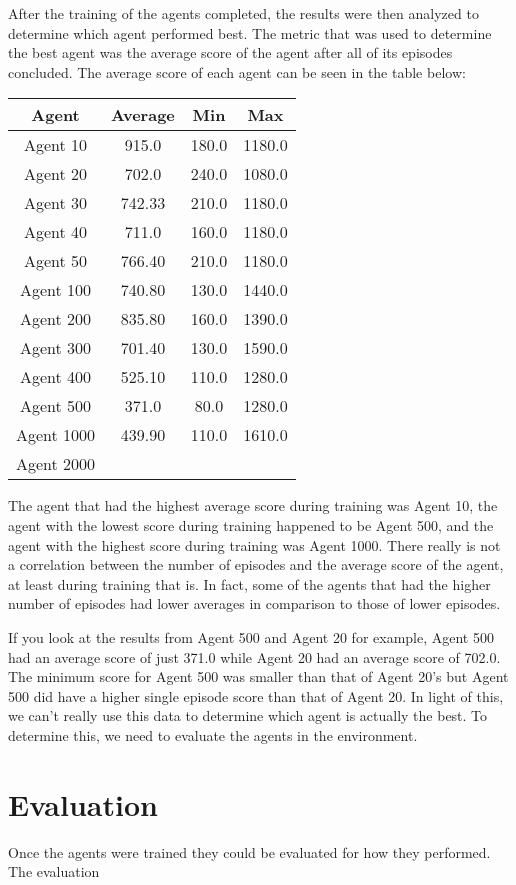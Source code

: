 \documentclass[
	a4paper, %
	10pt, %
	unnumberedsections, %
	twoside, %
]{LTJournalArticle}
\begin{document}
After the training of the agents completed, the results were then analyzed to determine which agent performed best. The metric that was used to determine the best agent was the average score of the agent
after all of its episodes concluded. The average score of each agent can be seen in the table below:

\begin{center}
	\begin{tabular}[ht]{|c|c|c|c|}
		\hline \textbf{Agent} & \textbf{Average} & \textbf{Min} & \textbf{Max} \\ \hline
		Agent 10 & 915.0 & 180.0 & 1180.0 \\ \hline
		Agent 20 & 702.0 & 240.0 & 1080.0 \\ \hline
		Agent 30 & 742.33 & 210.0 & 1180.0 \\ \hline
		Agent 40 & 711.0 & 160.0 & 1180.0 \\ \hline
		Agent 50 & 766.40 & 210.0 & 1180.0 \\ \hline
		Agent 100 & 740.80 & 130.0 & 1440.0 \\ \hline
		Agent 200 & 835.80 & 160.0 & 1390.0 \\ \hline
		Agent 300 & 701.40 & 130.0 & 1590.0 \\ \hline
		Agent 400 & 525.10 & 110.0 & 1280.0 \\ \hline
		Agent 500 & 371.0 & 80.0 & 1280.0 \\ \hline
		Agent 1000 & 439.90 & 110.0 & 1610.0 \\ \hline
		Agent 2000 & & & \\ \hline
	\end{tabular}
\end{center}

The agent that had the highest average score during training was Agent 10, the agent with the lowest score during training happened to be Agent 500, and the agent with the highest score during training was
Agent 1000. There really is not a correlation between the number of episodes and the average score of the agent, at least during training that is. In fact, some of the agents that had the higher number of
episodes had lower averages in comparison to those of lower episodes.

If you look at the results from Agent 500 and Agent 20 for example, Agent 500 had an average score of just 371.0 while Agent 20 had an average score of 702.0. The minimum score for Agent 500 was
smaller than that of Agent 20's but Agent 500 did have a higher single episode score than that of Agent 20. In light of this, we can't really use this data to determine which agent is actually the best.
To determine this, we need to evaluate the agents in the environment.

\section{Evaluation}

Once the agents were trained they could be evaluated for how they performed. The evaluation
\end{document}

